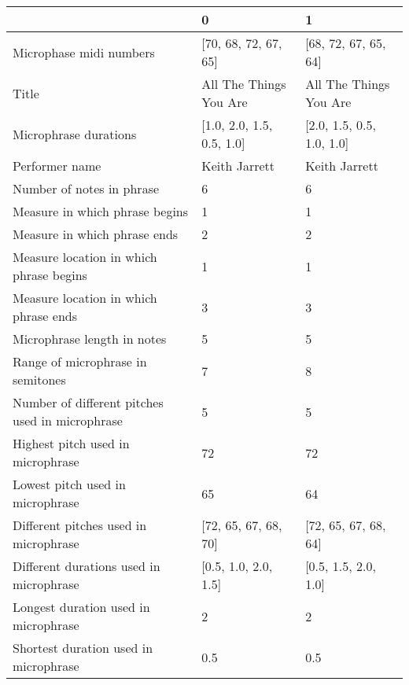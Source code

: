 \documentclass[11pt]{article}
\begin{document}
    \begin{tabular}{lll}
\toprule
{} &                                    0 &                                    1 \\
\midrule
Microphase midi numbers                                            &  [70, 68, 72, 67, 65] &  [68, 72, 67, 65, 64] \\
Title                                                              &  All The Things You Are &  All The Things You Are \\
Microphrase durations                                              &  [1.0, 2.0, 1.5, 0.5, 1.0] &  [2.0, 1.5, 0.5, 1.0, 1.0] \\
Performer name                                                     &  Keith Jarrett &  Keith Jarrett \\
Number of notes in phrase                                          &  6 &  6 \\
Measure in which phrase begins                                     &  1 &  1 \\
Measure in which phrase ends                                       &  2 &  2 \\
Measure location in which phrase begins                            &  1 &  1 \\
Measure location in which phrase ends                              &  3 &  3 \\
Microphrase length in notes                                        &  5 &  5 \\
Range of microphrase in semitones                                  &  7 &  8 \\
Number of different pitches used in microphrase                    &  5 &  5 \\
Highest pitch used in microphrase                                  &  72 &  72 \\
Lowest pitch used in microphrase                                   &  65 &  64 \\
Different pitches used in microphrase                              &  [72, 65, 67, 68, 70] &  [72, 65, 67, 68, 64] \\
Different durations used in microphrase                            &  [0.5, 1.0, 2.0, 1.5] &  [0.5, 1.5, 2.0, 1.0] \\
Longest duration used in microphrase                               &  2 &  2 \\
Shortest duration used in microphrase                              &  0.5 &  0.5 \\

\end{tabular}
\end{document}
